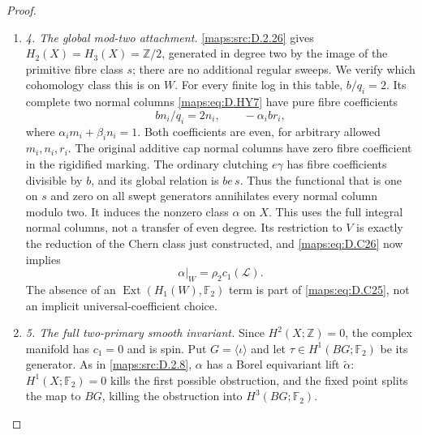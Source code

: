 \begin{proof}
\begin{enumerate}[label=\arabic*.,leftmargin=*]
\item \emph{4. The global mod-two attachment.}
\ref{maps:src:D.2.26} gives $H_2(X)=H_3(X)=\mathbb Z/2$, generated in degree two by
the image of the primitive fibre class $s$; there are no additional
regular sweeps. We verify which cohomology class this is on $W$.
For every finite log in this table, $b/q_i=2$. Its complete two normal
columns \eqref{maps:eq:D.HY7} have pure fibre coefficients
\[
                 bn_i/q_i=2n_i,
                \qquad -\alpha_i b r_i,                       \tag{D.C214}\label{maps:eq:D.C214}
\]
where $\alpha_i m_i+\beta_i n_i=1$. Both coefficients are even,
for arbitrary allowed $m_i,n_i,r_i$. The original additive cap normal
columns have zero fibre coefficient in the rigidified marking.
The ordinary clutching $e\gamma$ has fibre coefficients divisible by
$b$, and its global relation is $be\,s$. Thus the functional that is
one on $s$ and zero on all swept generators annihilates every normal
column modulo two. It induces the nonzero class $\alpha$ on $X$.
This uses the full integral normal columns, not a transfer of even
degree. Its restriction to $V$ is exactly the reduction of the Chern
class just constructed, and \eqref{maps:eq:D.C26} now implies
\[
                  \alpha|_W=\rho_2c_1(\mathcal L).             \tag{D.C215}\label{maps:eq:D.C215}
\]
The absence of an $\operatorname{Ext}(H_1(W),\mathbb F_2)$ term is
part of \eqref{maps:eq:D.C25}, not an implicit universal-coefficient choice.

\item \emph{5. The full two-primary smooth invariant.}
Since $H^2(X;\mathbb Z)=0$, the complex manifold has $c_1=0$ and is
spin. Put $G=\langle\iota\rangle$ and let
$\tau\in H^1(BG;\mathbb F_2)$ be its generator. As in \ref{maps:src:D.2.8},
$\alpha$ has a Borel equivariant lift $\widetilde\alpha$:
$H^1(X;\mathbb F_2)=0$ kills the first possible obstruction, and the
fixed point splits the map to $BG$, killing the obstruction into
$H^3(BG;\mathbb F_2)$.


\end{enumerate}
\end{proof}
